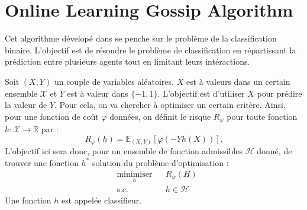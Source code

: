 \documentclass[a4paper]{article}
\begin{document}
\section{Online Learning Gossip Algorithm}
\label{sec:olga}

Cet algorithme d\'evelop\'e dans \cite{bianchi2013line} se penche sur le problème
de la classification binaire. L'objectif est de r\'esoudre le problème
de classification en r\'epartissant la pr\'ediction entre plusieurs agents
tout en limitant leurs int\'eractions.

Soit $(X, Y)$ un couple de variables al\'eatoires. $X$ est à valeurs dans un certain
ensemble $\mathcal{X}$ et $Y$ est à valeur dans $\{-1, 1\}$. L'objectif est
d'utiliser $X$ pour pr\'edire la valeur de $Y$. Pour cela, on va chercher à optimiser
un certain critère. Ainsi, pour une fonction de coût $\varphi$ donn\'ees, on d\'efinit
le risque $R_{\varphi}$ pour toute fonction $h : \mathcal{X} \rightarrow \mathbb{R}$ par :
\[
    R_{\varphi}(h) = \mathbb{E}_{(X,Y)} \left[\varphi\left( -Y h(X) \right)\right].
\]
L'objectif ici sera donc, pour un ensemble de fonction admissibles $\mathcal{H}$
donn\'e, de trouver une fonction $h^*$ solution du problème d'optimisation :
\begin{equation}
    \label{eq:binary_class_opti}
    \begin{aligned}
        & \underset{h}{\text{minimiser}}
        & & R_{\varphi}(H) \\
        & \text{s.c.}
        & & h \in \mathcal{H}
    \end{aligned}
\end{equation}
Une fonction $h$ est appel\'ee classifieur.
\end{document}
